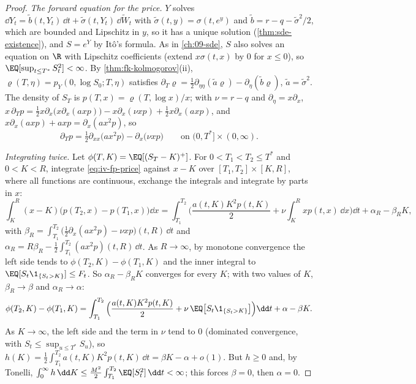 \begin{proof}
\emph{The forward equation for the price.} $Y$ solves
$\dd Y_t=\tilde b(t,Y_t)\,\dd t+\tilde\sigma(t,Y_t)\,\dd\widetilde W_t$ with $\tilde\sigma(t,y)=\sigma(t,e^y)$ and
$\tilde b=r-q-\tilde\sigma^2/2$, which are bounded and Lipschitz in $y$, so it has a unique solution
(\cref{thm:sde-existence}), and $S=e^Y$ by It\^o's formula. As in \cref{ch:09-sde}, $S$ also solves an
equation on $\R$ with Lipschitz coefficients (extend $x\sigma(t,x)$ by $0$ for $x\le0$), so
$\EQ[\sup_{t\le T^*}S_t^2]<\infty$. By \cref{thm:fk-kolmogorov}(ii), $\varrho(T,\eta)=p_Y(0,\log S_0;T,\eta)$
satisfies $\partial_T\varrho=\frac12\partial_{\eta\eta}(\tilde a\varrho)-\partial_\eta(\tilde b\varrho)$, $\tilde a=\tilde\sigma^2$.
The density of $S_T$ is $p(T,x)=\varrho(T,\log x)/x$; with $\nu=r-q$ and $\partial_\eta=x\partial_x$,
$x\,\partial_Tp=\frac12x\partial_x\big(x\partial_x(axp)\big)-x\partial_x(\nu xp)+\frac12x\partial_x(axp)$, and
$x\partial_x(axp)+axp=\partial_x(ax^2p)$, so
\begin{equation}\label{eq:iv-fp-price}
  \partial_Tp=\tfrac12\partial_{xx}\big(ax^2p\big)-\partial_x\big(\nu xp\big)\qquad\text{on }(0,T^*]\times(0,\infty).
\end{equation}

\emph{Integrating twice.} Let $\phi(T,K)=\EQ[(S_T-K)^+]$. For $0<T_1<T_2\le T^*$ and $0<K<R$, integrate
\eqref{eq:iv-fp-price} against $x-K$ over $[T_1,T_2]\times[K,R]$, where all functions are continuous,
exchange the integrals and integrate by parts in $x$:
\[
  \int_K^R(x-K)\big(p(T_2,x)-p(T_1,x)\big)\dd x
  =\int_{T_1}^{T_2}\!\Big(\frac{a(t,K)K^2p(t,K)}2+\nu\int_K^Rxp(t,x)\,\dd x\Big)\dd t+\alpha_R-\beta_RK,
\]
with $\beta_R=\int_{T_1}^{T_2}\big(\frac12\partial_x(ax^2p)-\nu xp\big)(t,R)\,\dd t$ and
$\alpha_R=R\beta_R-\frac12\int_{T_1}^{T_2}(ax^2p)(t,R)\,\dd t$. As $R\to\infty$, by monotone convergence the
left side tends to $\phi(T_2,K)-\phi(T_1,K)$ and the inner integral to $\EQ[S_t\1_{\{S_t>K\}}]\le F_t$.
So $\alpha_R-\beta_RK$ converges for every $K$; with two values of $K$, $\beta_R\to\beta$ and $\alpha_R\to\alpha$:
\begin{equation}\label{eq:iv-dupire-integrated}
  \phi(T_2,K)-\phi(T_1,K)=\int_{T_1}^{T_2}\Big(\frac{a(t,K)K^2p(t,K)}2+\nu\,\EQ\big[S_t\1_{\{S_t>K\}}\big]\Big)\dd t+\alpha-\beta K .
\end{equation}
As $K\to\infty$, the left side and the term in $\nu$ tend to $0$ (dominated convergence, with
$S_t\le\sup_{u\le T^*}S_u$), so $h(K)=\frac12\int_{T_1}^{T_2}a(t,K)K^2p(t,K)\,\dd t=\beta K-\alpha+o(1)$. But
$h\ge0$ and, by Tonelli, $\int_0^\infty h\,\dd K\le\frac{M^2}2\int_{T_1}^{T_2}\EQ[S_t^2]\,\dd t<\infty$; this
forces $\beta=0$, then $\alpha=0$.


\end{proof}
